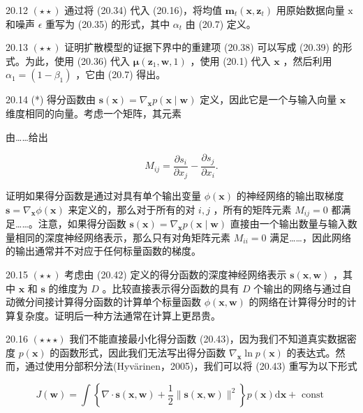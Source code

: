 \documentclass[10pt]{report}
\begin{document}
20.12 \(\left( {\star  \star  }\right)\) 通过将 (20.34) 代入 (20.16)，将均值 \({\mathbf{m}}_{t}\left( {\mathbf{x},{\mathbf{z}}_{t}}\right)\) 用原始数据向量 \(\mathrm{x}\) 和噪声 \(\epsilon\) 重写为 (20.35) 的形式，其中 \({\alpha }_{t}\) 由 (20.7) 定义。

20.13 \(\left( {\star  \star  }\right)\) 证明扩散模型的证据下界中的重建项 (20.38) 可以写成 (20.39) 的形式。为此，使用 (20.36) 代入 \(\mathbf{\mu }\left( {{\mathbf{z}}_{1},\mathbf{w},1}\right)\) ，使用 (20.1) 代入 \(\mathbf{x}\) ，然后利用 \({\alpha }_{1} = \left( {1 - {\beta }_{1}}\right)\) ，它由 (20.7) 得出。

20.14 (*) 得分函数由 \(\mathbf{s}\left( \mathbf{x}\right)  = {\nabla }_{\mathbf{x}}p\left( {\mathbf{x} \mid  \mathbf{w}}\right)\) 定义，因此它是一个与输入向量 \(\mathbf{x}\) 维度相同的向量。考虑一个矩阵，其元素

由……给出

\[
{M}_{ij} = \frac{\partial {s}_{i}}{\partial {x}_{j}} - \frac{\partial {s}_{j}}{\partial {x}_{i}}. \tag{20.64}
\]

证明如果得分函数是通过对具有单个输出变量 \(\phi \left( \mathbf{x}\right)\) 的神经网络的输出取梯度 \(\mathbf{s} = {\nabla }_{\mathbf{x}}\phi \left( \mathbf{x}\right)\) 来定义的，那么对于所有的对 \(i,j\) ，所有的矩阵元素 \({M}_{ij} = 0\) 都满足……。注意，如果得分函数 \(\mathbf{s}\left( \mathbf{x}\right)  = {\nabla }_{\mathbf{x}}p\left( {\mathbf{x} \mid  \mathbf{w}}\right)\) 直接由一个输出数量与输入数量相同的深度神经网络表示，那么只有对角矩阵元素 \({M}_{ii} = 0\) 满足……，因此网络的输出通常并不对应于任何标量函数的梯度。

20.15 \(\left( {\star  \star  }\right)\) 考虑由 (20.42) 定义的得分函数的深度神经网络表示 \(\mathbf{s}\left( {\mathbf{x},\mathbf{w}}\right)\) ，其中 \(\mathbf{x}\) 和 \(\mathbf{s}\) 的维度为 \(D\) 。比较直接表示得分函数的具有 \(D\) 个输出的网络与通过自动微分间接计算得分函数的计算单个标量函数 \(\phi \left( {\mathbf{x},\mathbf{w}}\right)\) 的网络在计算得分时的计算复杂度。证明后一种方法通常在计算上更昂贵。

20.16 \(\left( {\star  \star   \star  }\right)\) 我们不能直接最小化得分函数 (20.43)，因为我们不知道真实数据密度 \(p\left( \mathbf{x}\right)\) 的函数形式，因此我们无法写出得分函数 \({\nabla }_{\mathbf{x}}\ln p\left( \mathbf{x}\right)\) 的表达式。然而，通过使用分部积分法(Hyvärinen，2005)，我们可以将 (20.43) 重写为以下形式

\[
J\left( \mathbf{w}\right)  = \int \left\{  {\nabla  \cdot  \mathbf{s}\left( {\mathbf{x},\mathbf{w}}\right)  + \frac{1}{2}\parallel \mathbf{s}\left( {\mathbf{x},\mathbf{w}}\right) {\parallel }^{2}}\right\}  p\left( \mathbf{x}\right) \mathrm{d}\mathbf{x} + \text{ const } \tag{20.65}
\]
\end{document}

